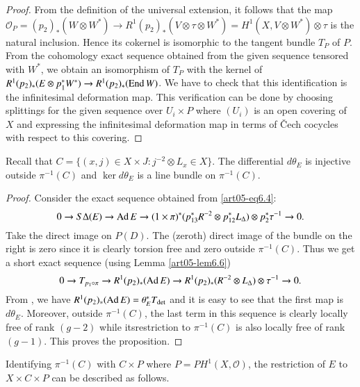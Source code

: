 \begin{proof}
From the definition of the universal extension, it follows that the
map $\mathscr{O}_{P}=(p_{2})_{*}(W\otimes W^{*})\to
R^{1}(p_{2})_{*}(V\otimes \tau \otimes W^{*})=H^{1}(X,V\otimes
W^{*})\otimes \tau$ is the natural inclusion. Hence its cokernel is
isomorphic to the tangent bundle $T_{P}$ of $P$. From the cohomology
exact sequence obtained from the given sequence tensored with $W^{*}$,
we obtain an isomorphism of $T_{P}$ with the kernel of
$R^{1}(p_{2})_{*}(E\otimes p^{*}_{1}W^{*})\to R^{1}(p_{2})_{*}(\operatorname{End}
W)$. We have to check that this identification is the infinitesimal
deformation map. This verification can be done by choosing splittings
for the given sequence over $U_{i}\times P$ where $(U_{i})$ is an open
covering of $X$ and expressing the infinitesimal deformation map in
terms of \v{C}ech cocycles with respect to this covering.
\end{proof}

\begin{proposition}\label{art05-prop6.8}
Recall that $C=\{(x,j)\in X\times J:j^{-2}\otimes L_{x}\in X\}$. The
differential $d\theta_{E}$ is injective outside $\pi^{-1}(C)$ and
$\ker d\theta_{E}$ is a line bundle on $\pi^{-1}(C)$. 
\end{proposition}

\begin{proof}
Consider the exact sequence obtained from \ref{art05-eq6.4}:
\setcounter{equation}{8}
\begin{equation}
0\to S\Delta(E)\to \operatorname{Ad} E\to (1\times \pi)^{*}(p^{*}_{13}R^{-2}\otimes
p^{*}_{12}L_{\Delta})\otimes p^{*}_{2}\tau^{-1}\to 0.\label{art05-eq6.9}
\end{equation}
Take the direct image on $P(D)$. The (zeroth) direct image of the
bundle on the right is zero since it is clearly torsion free and zero
outside $\pi^{-1}(C)$. Thus we get a short exact sequence (using
Lemma \ref{art05-lem6.6}) 
$$
0\to T_{p_{1}\circ\pi}\to R^{1}(p_{2})_{*}(\operatorname{Ad} E)\to
R^{1}(p_{2})_{*}(R^{-2}\otimes L_{\Delta})\otimes \tau^{-1}\to 0.
$$
From \cite[Lemma 2.6]{art05-key6}, we have $R^{1}(p_{2})_{*}(\operatorname{Ad}
E)=\theta^{*}_{E}T_{\det}$ and it is easy to see that the first map is
$d\theta_{E}$. Moreover, outside $\pi^{-1}(C)$, the last term in this
sequence is clearly locally free of rank $(g-2)$ while
its\pageoriginale restriction to $\pi^{-1}(C)$ is also locally free of
rank $(g-1)$. This proves the proposition.
\end{proof}

Identifying $\pi^{-1}(C)$ with $C\times P$ where
$P=PH^{1}(X,\mathscr{O})$, the restriction of $E$ to $X\times C\times
P$ can be described as follows.



